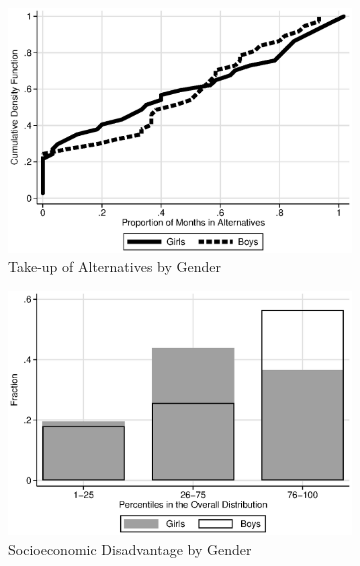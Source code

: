 
\begin{figure}
\centering
\caption{Gender and Baseline Socioeconomic Disadvantage in the Control Group} \label{figure:socdis}
\begin{subfigure}[h]{0.4\textwidth}
	\centering
	\caption{Take-up of Alternatives by Gender} \label{figure:altgender}
	\includegraphics[width=\textwidth]{output/abccare_controlcontamination_boysgirls}
\end{subfigure}%
\begin{subfigure}[h]{0.4\textwidth}
	\centering
	\caption{Socioeconomic Disadvantage by Gender} \label{figure:disadgender}
	\includegraphics[width=\textwidth]{output/factorbase_girlsboyscompare}
\end{subfigure}
\begin{subfigure}[h]{0.4\textwidth}

\end{subfigure}
\end{figure}
